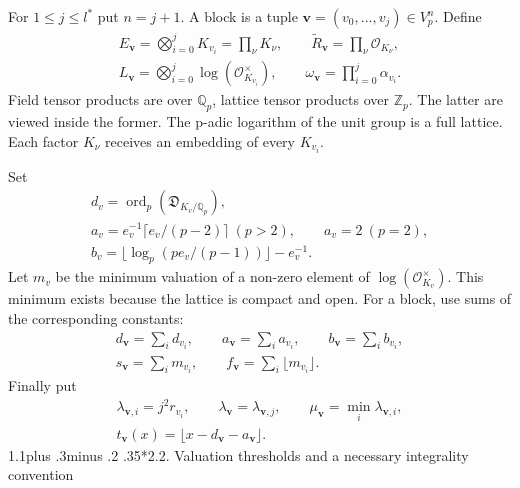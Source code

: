 \documentclass[11pt,a4paper]{amsart}
\makeatletter
\renewcommand\subsection{\@startsection{subsection}{2}{\z@}
{1.1\baselineskip plus .3\baselineskip minus .2\baselineskip}
{.35\baselineskip}{\normalfont\bfseries}}
\makeatother
\begin{document}
For $1\le j\le l^*$ put $n=j+1$. A block is a tuple $\mathbf v=(v_0,\ldots,v_j)\in V_p^n$. Define
\begin{equation}
\begin{gathered}
E_{\mathbf v}=\bigotimes_{i=0}^jK_{v_i}=\prod_\nu K_\nu,\qquad \widetilde R_{\mathbf v}=\prod_\nu\mathcal O_{K_\nu},\\ L_{\mathbf v}=\bigotimes_{i=0}^j\log(\mathcal O_{K_{v_i}}^\times),\qquad \omega_{\mathbf v}=\prod_{i=0}^j\alpha_{v_i}.
\end{gathered}
\tag{2.2}\label{eq:2.2}
\end{equation}
Field tensor products are over $\mathbb Q_p$, lattice tensor products over $\mathbb Z_p$. The latter are viewed inside the former. The p-adic logarithm of the unit group is a full lattice. Each factor $K_\nu$ receives an embedding of every $K_{v_i}$.


Set
\begin{equation}
\begin{gathered}
d_v=\operatorname{ord}_p(\mathfrak D_{K_v/\mathbb Q_p}),\\ a_v=e_v^{-1}\lceil e_v/(p-2)\rceil\ (p>2),\qquad a_v=2\ (p=2),\\ b_v=\lfloor\log_p(pe_v/(p-1))\rfloor-e_v^{-1}.
\end{gathered}
\tag{2.3}\label{eq:2.3}
\end{equation}
Let $m_v$ be the minimum valuation of a non-zero element of $\log(\mathcal O_{K_v}^\times)$. This minimum exists because the lattice is compact and open. For a block, use sums of the corresponding constants:
\begin{equation}
\begin{gathered}
d_{\mathbf v}=\sum_i d_{v_i},\qquad a_{\mathbf v}=\sum_i a_{v_i},\qquad b_{\mathbf v}=\sum_i b_{v_i},\\ s_{\mathbf v}=\sum_i m_{v_i},\qquad f_{\mathbf v}=\sum_i\lfloor m_{v_i}\rfloor.
\end{gathered}
\tag{2.4}\label{eq:2.4}
\end{equation}
Finally put
\begin{equation}
\begin{gathered}
\lambda_{\mathbf v,i}=j^2r_{v_i},\qquad\lambda_{\mathbf v}=\lambda_{\mathbf v,j},\qquad \mu_{\mathbf v}=\min_i\lambda_{\mathbf v,i},\\t_{\mathbf v}(x)=\lfloor x-d_{\mathbf v}-a_{\mathbf v}\rfloor.
\end{gathered}
\tag{2.5}\label{eq:2.5}
\end{equation}
\subsection*{2.2. Valuation thresholds and a necessary integrality convention}
\end{document}
